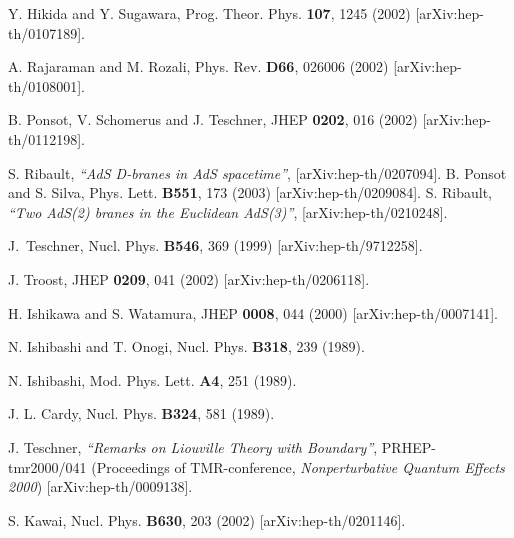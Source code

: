 \documentclass[a4paper,12pt]{article}
\begin{document}
\begin{thebibliography}{99}
 Y. Hikida and Y. Sugawara,
Prog. Theor. Phys. \textbf{107}, 1245 (2002)
[arXiv:hep-th/0107189].

  A. Rajaraman and M. Rozali,
Phys. Rev. \textbf{D66}, 026006 (2002) [arXiv:hep-th/0108001].

  B. Ponsot, V. Schomerus and J. Teschner,
JHEP \textbf{0202}, 016 (2002) [arXiv:hep-th/0112198].

  S. Ribault, \textit{``AdS\coordHE{} D-branes in AdS\coordHE{}
spacetime''}, [arXiv:hep-th/0207094].
\newline
B. Ponsot and S. Silva,
Phys. Lett. {\bf B551}, 173 (2003) [arXiv:hep-th/0209084].
\newline S. Ribault, \textit{``Two AdS(2) branes in the Euclidean
AdS(3)''}, [arXiv:hep-th/0210248].

  J.~Teschner,
Nucl. Phys. \textbf{B546}, 369 (1999) [arXiv:hep-th/9712258].

  J. Troost,
JHEP \textbf{0209}, 041 (2002) [arXiv:hep-th/0206118].

  H. Ishikawa and S. Watamura,
JHEP \textbf{0008}, 044 (2000) [arXiv:hep-th/0007141].

  N. Ishibashi and T. Onogi,
Nucl. Phys. \textbf{B318}, 239 (1989).

  N. Ishibashi,
Mod. Phys. Lett. \textbf{A4}, 251 (1989).

  J. L. Cardy,
Nucl. Phys. \textbf{B324}, 581 (1989).

  J. Teschner, \textit{``Remarks on Liouville Theory
with Boundary''}, PRHEP-tmr2000/041 (Proceedings of TMR-conference, \textit{%
Nonperturbative Quantum Effects 2000}) [arXiv:hep-th/0009138].

  S. Kawai,
Nucl. Phys. \textbf{B630}, 203 (2002) [arXiv:hep-th/0201146].
\end{thebibliography}
\end{document}
